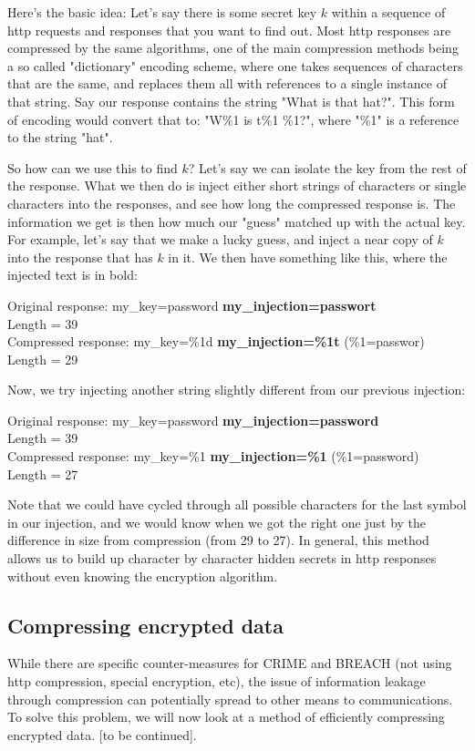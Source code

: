 \documentclass[11pt]{article}
\begin{document}
Here's the basic idea: 
Let's say there is some secret key $k$ within a sequence of http requests and responses that 
you want to find out. Most http responses are compressed by the same algorithms, one of the 
main compression methods being a so called "dictionary" encoding scheme, where one takes sequences 
of characters that are the same, and replaces them all with references to a single instance of that string. 
Say our response contains the string "What is that hat?". This form of encoding would convert that to: 
"W\%1 is t\%1 \%1?", where "\%1" is a reference to the string "hat". 

So how can we use this to find $k$? Let's say we can isolate the key from the rest of the response. 
What we then do is inject either short strings of characters or single characters into the responses, and see how long 
the compressed response is. The information we get is then how much our "guess" matched up with the actual key. 
For example, let's say that we make a lucky guess, and inject a near copy of $k$ into the response that has $k$ in it. 
We then have something like this, where the injected text is in bold:
\begin{center}
	Original response: my\_key=password \textbf{my\_injection=passwort}\\
	Length = 39\\
	Compressed response: my\_key=\%1d \textbf{my\_injection=\%1t} (\%1=passwor)\\
	Length = 29\\
\end{center}
Now, we try injecting another string slightly different from our previous injection:
\begin{center}
	Original response: my\_key=password \textbf{my\_injection=password}\\
	Length = 39\\
	Compressed response: my\_key=\%1 \textbf{my\_injection=\%1} (\%1=password)\\
	Length = 27\\
\end{center}
Note that we could have cycled through all possible characters for the last symbol in our injection, 
and we would know when we got the right one just by the difference in size from compression (from 29 to 27). 
In general, this method allows us to build up character by character hidden secrets in http responses 
without even knowing the encryption algorithm. 

\subsection{Compressing encrypted data}\label{compress-encrypt-subsect}
While there are specific counter-measures for CRIME and BREACH (not using http compression, special encryption, etc), 
the issue of information leakage through compression can potentially spread to other means to communications. 
To solve this problem, we will now look at a method of efficiently compressing encrypted data. [to be continued].






% 
% 

\end{document}
